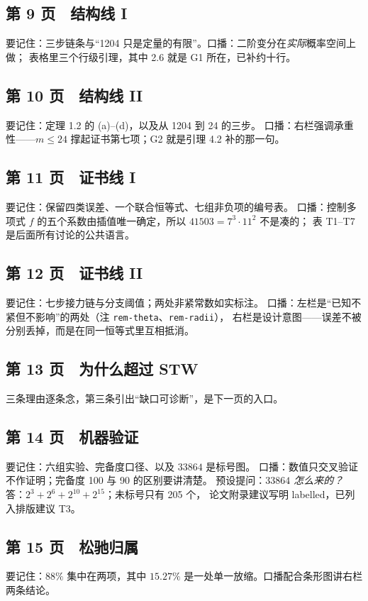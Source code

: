 \documentclass[UTF8,11pt]{ctexart}
\newcommand{\file}[1]{\texttt{#1}}
\begin{document}
\subsection*{第 9 页　结构线 I}
要记住：三步链条与``1204 只是定量的有限''。口播：二阶变分在\emph{实际}概率空间上做；
表格里三个行级引理，其中 2.6 就是 G1 所在，已补约十行。

\subsection*{第 10 页　结构线 II}
要记住：定理 1.2 的 (a)--(d)，以及从 1204 到 24 的三步。
口播：右栏强调承重性——$m\le24$ 撑起证书第七项；G2 就是引理 4.2 补的那一句。

\subsection*{第 11 页　证书线 I}
要记住：保留四类误差、一个联合恒等式、七组非负项的编号表。
口播：控制多项式 $f$ 的五个系数由插值唯一确定，所以 $41503=7^3\cdot11^2$ 不是凑的；
表 T1--T7 是后面所有讨论的公共语言。

\subsection*{第 12 页　证书线 II}
要记住：七步接力链与分支阈值；两处非紧常数如实标注。
口播：左栏是``已知不紧但不影响''的两处（注 \file{rem-theta}、\file{rem-radii}），
右栏是设计意图——误差不被分别丢掉，而是在同一恒等式里互相抵消。

\subsection*{第 13 页　为什么超过 STW}
三条理由逐条念，第三条引出``缺口可诊断''，是下一页的入口。

\subsection*{第 14 页　机器验证}
要记住：六组实验、完备度口径、以及 $33864$ 是标号图。
口播：数值只交叉验证不作证明；完备度 100 与 90 的区别要讲清楚。
预设提问：\emph{$33864$ 怎么来的？}答：$2^3+2^6+2^{10}+2^{15}$；未标号只有 205 个，
论文附录建议写明 labelled，已列入排版建议 T3。

\subsection*{第 15 页　松驰归属}
要记住：$88\%$ 集中在两项，其中 $15.27\%$ 是一处单一放缩。口播配合条形图讲右栏两条结论。
\end{document}
